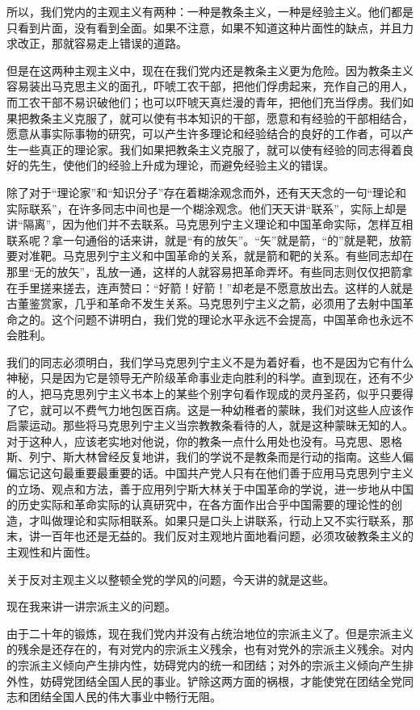 所以，我们党内的主观主义有两种：一种是教条主义，一种是经验主义。他们都是只看到片面，没有看到全面。如果不注意，如果不知道这种片面性的缺点，并且力求改正，那就容易走上错误的道路。

但是在这两种主观主义中，现在在我们党内还是教条主义更为危险。因为教条主义容易装出马克思主义的面孔，吓唬工农干部，把他们俘虏起来，充作自己的用人，而工农干部不易识破他们；也可以吓唬天真烂漫的青年，把他们充当俘虏。我们如果把教条主义克服了，就可以使有书本知识的干部，愿意和有经验的干部相结合，愿意从事实际事物的研究，可以产生许多理论和经验结合的良好的工作者，可以产生一些真正的理论家。我们如果把教条主义克服了，就可以使有经验的同志得着良好的先生，使他们的经验上升成为理论，而避免经验主义的错误。

除了对于“理论家”和“知识分子”存在着糊涂观念而外，还有天天念的一句“理论和实际联系”，在许多同志中间也是一个糊涂观念。他们天天讲“联系”，实际上却是讲“隔离”，因为他们并不去联系。马克思列宁主义理论和中国革命实际，怎样互相联系呢？拿一句通俗的话来讲，就是“有的放矢”。“矢”就是箭，“的”就是靶，放箭要对准靶。马克思列宁主义和中国革命的关系，就是箭和靶的关系。有些同志却在那里“无的放矢”，乱放一通，这样的人就容易把革命弄坏。有些同志则仅仅把箭拿在手里搓来搓去，连声赞曰：“好箭！好箭！”却老是不愿意放出去。这样的人就是古董鉴赏家，几乎和革命不发生关系。马克思列宁主义之箭，必须用了去射中国革命之的。这个问题不讲明白，我们党的理论水平永远不会提高，中国革命也永远不会胜利。

我们的同志必须明白，我们学马克思列宁主义不是为着好看，也不是因为它有什么神秘，只是因为它是领导无产阶级革命事业走向胜利的科学。直到现在，还有不少的人，把马克思列宁主义书本上的某些个别字句看作现成的灵丹圣药，似乎只要得了它，就可以不费气力地包医百病。这是一种幼稚者的蒙昧，我们对这些人应该作启蒙运动。那些将马克思列宁主义当宗教教条看待的人，就是这种蒙昧无知的人。对于这种人，应该老实地对他说，你的教条一点什么用处也没有。马克思、恩格斯、列宁、斯大林曾经反复地讲，我们的学说不是教条而是行动的指南。这些人偏偏忘记这句最重要最重要的话。中国共产党人只有在他们善于应用马克思列宁主义的立场、观点和方法，善于应用列宁斯大林关于中国革命的学说，进一步地从中国的历史实际和革命实际的认真研究中，在各方面作出合乎中国需要的理论性的创造，才叫做理论和实际相联系。如果只是口头上讲联系，行动上又不实行联系，那末，讲一百年也还是无益的。我们反对主观地片面地看问题，必须攻破教条主义的主观性和片面性。

关于反对主观主义以整顿全党的学风的问题，今天讲的就是这些。

现在我来讲一讲宗派主义的问题。

由于二十年的锻炼，现在我们党内并没有占统治地位的宗派主义了。但是宗派主义的残余是还存在的，有对党内的宗派主义残余，也有对党外的宗派主义残余。对内的宗派主义倾向产生排内性，妨碍党内的统一和团结；对外的宗派主义倾向产生排外性，妨碍党团结全国人民的事业。铲除这两方面的祸根，才能使党在团结全党同志和团结全国人民的伟大事业中畅行无阻。

